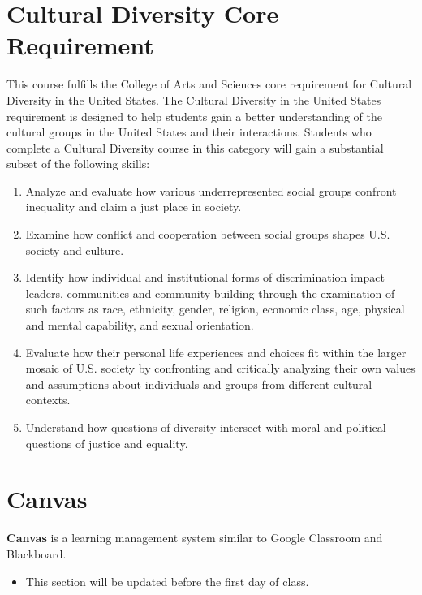 \documentclass[
]{book}
\newenvironment{rmdblock}[1]
  {\begin{shaded*}
  \begin{itemize}
  \renewcommand{\labelitemi}{
    \raisebox{-.7\height}[0pt][0pt]{
      {\setkeys{Gin}{width=3em,keepaspectratio}\texttt{[image: images/\#1]}}
    }
  }
  \item
  }
  {
  \end{itemize}
  \end{shaded*}
  }
\newenvironment{rmdwarning}
  {\begin{rmdblock}{warning}}
  {\end{rmdblock}}
\begin{document}
\hypertarget{cultural-diversity-core-requirement}{%
\section{Cultural Diversity Core Requirement}\label{cultural-diversity-core-requirement}}

This course fulfills the College of Arts and Sciences core requirement for Cultural Diversity in the United States. The Cultural Diversity in the United States requirement is designed to help students gain a better understanding of the cultural groups in the United States and their interactions. Students who complete a Cultural Diversity course in this category will gain a substantial subset of the following skills:

\begin{enumerate}
\def\labelenumi{\arabic{enumi}.}
\item
  Analyze and evaluate how various underrepresented social groups confront inequality and claim a just place in society.
\item
  Examine how conflict and cooperation between social groups shapes U.S. society and culture.
\item
  Identify how individual and institutional forms of discrimination impact leaders, communities and community building through the examination of such factors as race, ethnicity, gender, religion, economic class, age, physical and mental capability, and sexual orientation.
\item
  Evaluate how their personal life experiences and choices fit within the larger mosaic of U.S. society by confronting and critically analyzing their own values and assumptions about individuals and groups from different cultural contexts.
\item
  Understand how questions of diversity intersect with moral and political questions of justice and equality.
\end{enumerate}

\hypertarget{canvas}{%
\section{Canvas}\label{canvas}}

\textbf{Canvas} is a learning management system similar to Google Classroom and Blackboard.

\begin{rmdwarning}
This section will be updated before the first day of class.
\end{rmdwarning}
\end{document}
